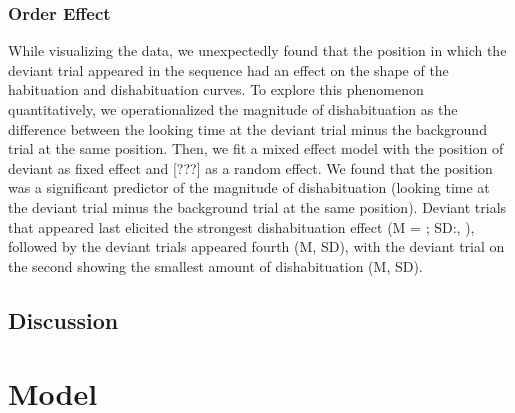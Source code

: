\documentclass[10pt, letterpaper]{article}
\begin{document}
\hypertarget{order-effect}{%
\subsubsection{Order Effect}\label{order-effect}}

While visualizing the data, we unexpectedly found that the position in
which the deviant trial appeared in the sequence had an effect on the
shape of the habituation and dishabituation curves. To explore this
phenomenon quantitatively, we operationalized the magnitude of
dishabituation as the difference between the looking time at the deviant
trial minus the background trial at the same position. Then, we fit a
mixed effect model with the position of deviant as fixed effect and
{[}???{]} as a random effect. We found that the position was a
significant predictor of the magnitude of dishabituation (looking time
at the deviant trial minus the background trial at the same position).
Deviant trials that appeared last elicited the strongest dishabituation
effect (M = ; SD:, ), followed by the deviant trials appeared fourth (M,
SD), with the deviant trial on the second showing the smallest amount of
dishabituation (M, SD).

\hypertarget{discussion}{%
\subsection{Discussion}\label{discussion}}

\hypertarget{model}{%
\section{Model}\label{model}}
\end{document}
